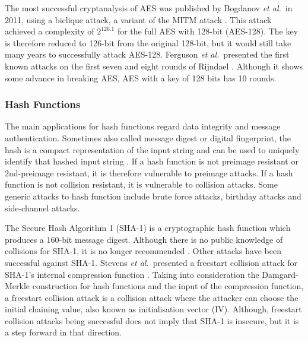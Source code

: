 \documentclass{sig-alternate-05-2015}
\begin{document}
The most successful cryptanalysis of AES was published by Bogdanov \emph{et al.}~in 2011, using a biclique attack, a variant of the MITM attack \cite{Bogdanov2011}. 
This attack achieved a complexity of $2^{126.1}$ for the full AES with 128-bit (AES-128). The key is therefore reduced to 126-bit from the original 128-bit, but it would still take many years to successfully attack AES-128.
Ferguson \textit{et al.}~presented the first known attacks on the first seven and eight rounds of Rijndael \cite{Ferguson2001}. Although it shows some advance in breaking AES, AES with a key of 128 bits has 10 rounds.

\subsubsection{Hash Functions}

The main applications for hash functions %
regard data integrity and message authentication. Sometimes also called message digest or digital fingerprint, the hash is a compact representation of the input string and can be used to uniquely identify that hashed input string \cite{Menezes1996-ch9}.
If a hash function is not preimage resistant or 2nd-preimage resistant, it is therefore vulnerable to preimage attacks. If a hash function is not collision resistant, it is vulnerable to collision attacks.
Some generic attacks to hash function include brute force attacks, birthday attacks and side-channel attacks.

The Secure Hash Algorithm 1 (SHA-1) is a cryptographic hash function which produces a 160-bit message digest. Although there is no public knowledge of collisions for SHA-1, it is no longer recommended \cite{ENISA:14}.
Other attacks have been successful against SHA-1. Stevens \emph{et al.}~presented a freestart collision attack for SHA-1's internal compression function \cite{Stevens15}. Taking into consideration the Damgard-Merkle \cite{Merkle79} construction for hash functions and the input of the compression function, a freestart collision attack is a collision attack where the attacker can choose the initial chaining value, also known as initialisation vector (IV). Although, freestart collision attacks being successful does not imply that SHA-1 is insecure, but it is a step forward in that direction.
\end{document}
